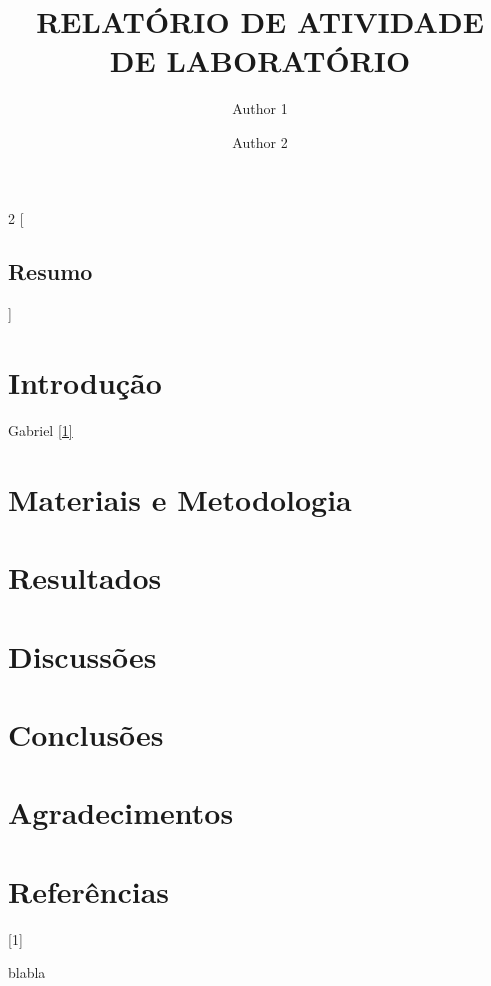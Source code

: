 \documentclass[12pt]{article}
\title{\textbf{RELATÓRIO DE ATIVIDADE DE LABORATÓRIO }}
\author[1]{Author 1}
\author[1]{Author 2}
\affil[1]{Ilum- Escola de Ciência}
\date{\vspace{-1.5cm}}
\begin{document}
\pagestyle{plain}
\renewcommand{\labelenumii}{\arabic{enumi}.\arabic{enumii}}
\renewcommand{\labelenumiii}{\arabic{enumi}.\arabic{enumii}.\arabic{enumiii}}
\renewcommand{\labelenumiv}{\arabic{enumi}.\arabic{enumii}.\arabic{enumiii}.\arabic{enumiv}}
\maketitle

\thispagestyle{firstpage}
\begin{multicols}{2}
[\begin{center}
\section*{Resumo}
\end{center}
\blindtext]
\renewcommand{\contentsname}{Sumário}
\tableofcontents
\section*{Introdução}
\blindtext \blindtext
Gabriel \hyperlink{ref1}{[1]}
\section*{Materiais e Metodologia}
\blindtext \blindtext
\section*{Resultados}
\blindtext \blindtext
\section*{Discussões}
\blindtext \blindtext
\section*{Conclusões}
\blindtext \blindtext
\section*{Agradecimentos}
\blindtext \blindtext
\section*{Referências}
 \hypertarget{ref1}{[1]} blabla \\
 \blindtext
\end{multicols}
\end{document}
